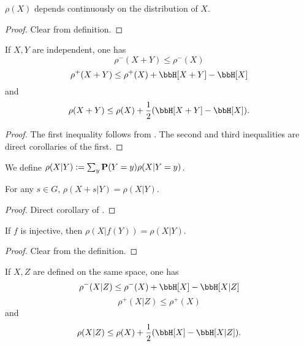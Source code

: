 \begin{lemma}\label{rho-cts}\leanok{} $\rho(X)$ depends continuously on the distribution of $X$.
\end{lemma}

\begin{proof}  Clear from definition.
\end{proof}

\begin{lemma}\label{rho-sums}\leanok  If $X,Y$ are independent, one has
  $$ \rho^-(X+Y) \leq \rho^-(X)$$
  $$ \rho^+(X+Y) \leq \rho^+(X) + \bbH[X+Y] - \bbH[X]$$
and
  $$ \rho(X+Y) \leq \rho(X) + \frac{1}{2}( \bbH[X+Y] - \bbH[X] ).$$
\end{lemma}

\begin{proof}
The first inequality follows from . The second and third inequalities are direct corollaries of the first.
\end{proof}


\begin{definition}\label{rho-cond-def}\leanok We define $\rho(X|Y) := \sum_y {\bf P}(Y=y) \rho(X|Y=y)$.
\end{definition}

\begin{lemma}\label{rho-cond-invariant}\leanok
  For any $s\in G$, $\rho(X+s|Y)=\rho(X|Y)$.
\end{lemma}
\begin{proof}
  \leanok
  Direct corollary of .
\end{proof}

\begin{lemma}\label{rho-cond-relabeled}\leanok
  If $f$ is injective, then $\rho(X|f(Y))=\rho(X|Y)$.
\end{lemma}
\begin{proof}
  Clear from the definition.
\end{proof}

\begin{lemma}\label{rho-cond}\leanok  If $X,Z$ are defined on the same space, one has
  $$ \rho^-(X|Z) \leq \rho^-(X) + \bbH[X] - \bbH[X|Z]$$
  $$ \rho^+(X|Z) \leq \rho^+(X)$$
and
  $$ \rho(X|Z) \leq \rho(X) + \frac{1}{2}( \bbH[X] - \bbH[X|Z] ).$$
\end{lemma}

